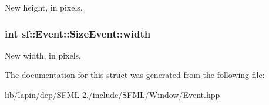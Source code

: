 New height, in pixels. 

\hypertarget{structsf_1_1_event_1_1_size_event_a20ea1b78c9bb1604432f8f0067bbfd94}{
\subsubsection[{width}]{ {\bf int} sf\-::\-Event\-::\-Size\-Event\-::width}}\label{structsf_1_1_event_1_1_size_event_a20ea1b78c9bb1604432f8f0067bbfd94}


New width, in pixels. 



The documentation for this struct was generated from the following file\-:\begin{DoxyCompactItemize}
\item 
lib/lapin/dep/\-S\-F\-M\-L-\/2./include/\-S\-F\-M\-L/\-Window/\hyperlink{lib_2lapin_2dep_2_s_f_m_l-2_83_2include_2_s_f_m_l_2_window_2_event_8hpp}{Event.\-hpp}\end{DoxyCompactItemize}
